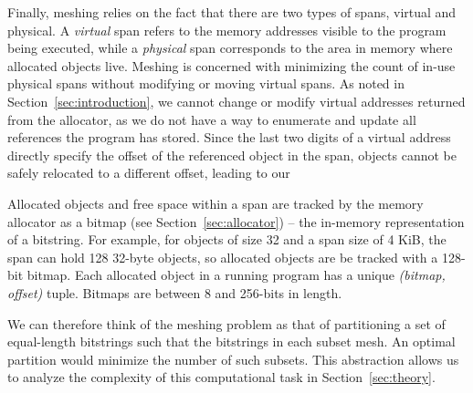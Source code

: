 Finally, meshing relies on the fact that there are two types of spans,
virtual and physical.  A \textit{virtual} span refers to the memory
addresses visible to the program being executed, while a
\textit{physical} span corresponds to the area in memory where
allocated objects live.  Meshing is concerned with minimizing the
count of in-use physical spans without modifying or moving virtual
spans.  As noted in Section~\ref{sec:introduction}, we cannot change
or modify virtual addresses returned from the allocator, as we do
not have a way to enumerate and update all references the program has
stored.  Since the last two digits of a virtual address directly specify the offset of the referenced object in the span, objects cannot
be safely relocated to a different offset, leading to our 

Allocated objects and free space within a span are tracked by the
memory allocator as a bitmap (see Section~\ref{sec:allocator}) -- the
in-memory representation of a bitstring.  For example, for objects of
size 32 and a span size of 4 KiB, the span can hold 128 32-byte
objects, so allocated objects are be tracked with a 128-bit bitmap.
Each allocated object in a running program has a unique
\textit{(bitmap, offset)} tuple.  Bitmaps are between 8 and 256-bits
in length.

We can therefore think of the meshing problem as that of partitioning
a set of equal-length bitstrings such that the bitstrings in each subset
mesh.  An optimal partition would minimize the number of such subsets.
This abstraction allows us to analyze the complexity of this computational
task in Section~\ref{sec:theory}.